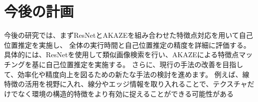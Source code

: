 \documentclass[]{jarticle}          %
\begin{document}
\section{今後の計画}
今後の研究では、まずResNetとAKAZEを組み合わせた特徴点対応を用いて自己位置推定を実施し、
全体の実行時間と自己位置推定の精度を詳細に評価する。
具体的には、ResNetを使用して類似画像検索を行い、AKAZEによる特徴点マッチングを基に自己位置推定を実施する。
さらに、現行の手法の改善を目指して、効率化や精度向上を図るための新たな手法の検討を進めます。
例えば、線特徴の活用を視野に入れ、線分やエッジ情報を取り入れることで、テクスチャだけでなく環境の構造的特徴をより有効に捉えることができる可能性がある
\end{document}
